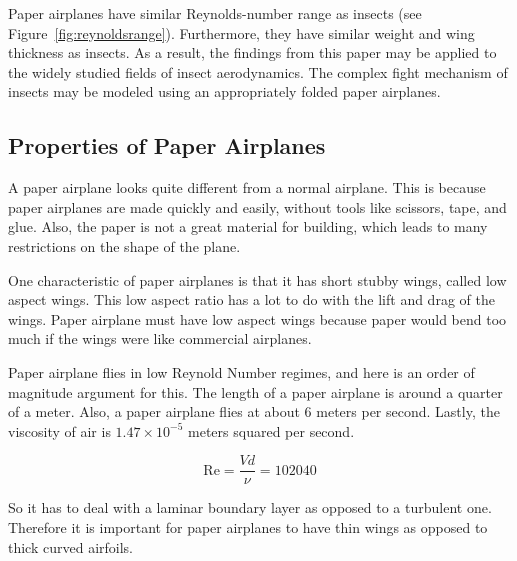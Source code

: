 Paper airplanes have similar Reynolds-number range as insects (see Figure~\ref{fig:reynoldsrange}). Furthermore, they have similar weight and wing thickness as
insects. As a result, the findings from this paper may be applied to the widely studied fields of insect aerodynamics. The complex fight mechanism of insects may
be modeled using an appropriately folded paper airplanes.

\subsection{Properties of Paper Airplanes}

A paper airplane looks quite different from a normal airplane. This is because
paper airplanes are made quickly and easily, without tools like scissors, tape,
and glue. Also, the paper is not a great material for building, which leads to many
restrictions on the shape of the plane.

One characteristic of paper airplanes is that it has short stubby
wings, called low aspect wings. This low aspect ratio has a lot to do with the
lift and drag of the wings. Paper airplane must have low aspect wings because
paper would bend too much if the wings were like commercial airplanes.

Paper airplane flies in low Reynold Number regimes, and here is an order of magnitude argument for this. The length of a paper airplane is around a quarter of a meter. Also, a paper airplane flies at about 6 meters per second. Lastly, the viscosity of air is $1.47 \times 10^{-5}$ meters squared per second.

\[\text{Re} = \frac{Vd}{\nu} = 102040 \]


So it has to deal with a laminar boundary layer as opposed to a turbulent one.
Therefore it is important for paper airplanes to have thin wings as opposed to
thick curved airfoils.


